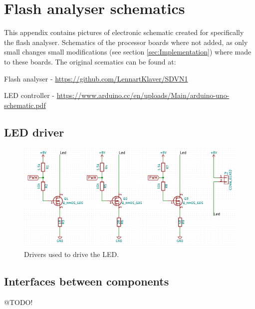 \chapter{Flash analyser schematics}
\label{app_schematics}
This appendix contains pictures of electronic schematic created for specifically the flash analyser. Schematics of the processor boards where not added, as only small changes small modifications (see section \ref{sec:Implementation}) where made to these boards. The original scematics can be found at: 
\item Flash analyser - \url{https://github.com/LennartKlaver/SDVN1} 
\item LED controller - \url{https://www.arduino.cc/en/uploads/Main/arduino-uno-schematic.pdf}

\section{LED driver}
\begin{figure}[!h]
	\includegraphics[width=\textwidth]{pics/LED_Driver.png}
	\caption{Drivers used to drive the LED.}
	\label{fig:LED_Driver}
\end{figure}

\section{Interfaces between components}
@TODO!